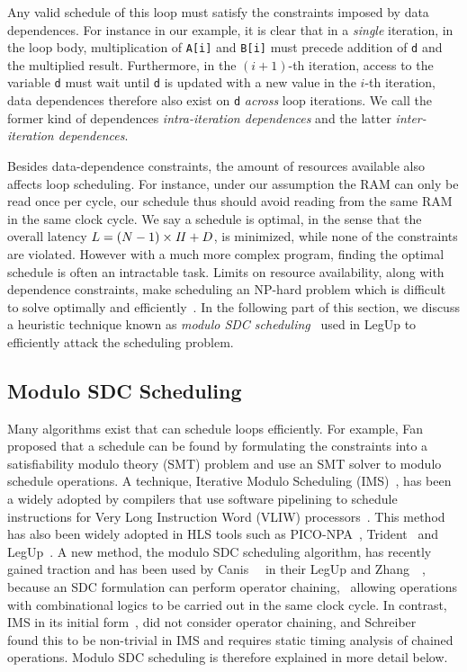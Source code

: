Any valid schedule of this loop must satisfy the constraints imposed by data
dependences.  For instance in our example, it is clear that in a \emph{single}
iteration, in the loop body, multiplication of \verb|A[i]| and \verb|B[i]|
must precede addition of \verb|d| and the multiplied result.  Furthermore, in
the $(i + 1)$-th iteration, access to the variable \verb|d| must wait until
\verb|d| is updated with a new value in the $i$-th iteration, data dependences
therefore also exist on \verb|d| \emph{across} loop iterations.  We call the
former kind of dependences \emph{intra-iteration dependences} and the latter
\emph{inter-iteration dependences}.

Besides data-dependence constraints, the amount of resources available also
affects loop scheduling.  For instance, under our assumption the RAM can only
be read once per cycle, our schedule thus should avoid reading from the same
RAM in the same clock cycle.  We say a schedule is optimal, in the sense that
the overall latency $L = (N - 1) \times \mathit{II} + D$, is minimized, while none
of the constraints are violated.  However with a much more complex program,
finding the optimal schedule is often an intractable task.  Limits on resource
availability, along with dependence constraints, make scheduling an NP-hard
problem which is difficult to solve optimally and efficiently~\cite{hwang91}.
In the following part of this section, we discuss a heuristic technique known
as \emph{modulo SDC scheduling}~\cite{zhang13, canis14} used in LegUp to
efficiently attack the scheduling problem.


\subsection{Modulo SDC Scheduling}
\label{bg:sub:modulo_sdc_scheduling}

Many algorithms exist that can schedule loops efficiently.  For example,
Fan~\etal~\cite{fan08} proposed that a schedule can be found by formulating
the constraints into a satisfiability modulo theory (SMT) problem and use
an SMT solver to modulo schedule operations.  A technique, Iterative Modulo
Scheduling (IMS)~\cite{rau94}, has been a widely adopted by compilers
that use software pipelining to schedule instructions for Very Long
Instruction Word (VLIW) processors~\cite{mcnairy03}.  This method has also
been widely adopted in HLS tools such as PICO-NPA~\cite{schreiber02},
Trident~\cite{tripp05} and LegUp~\cite{canis13, canis14}.  A new method, the
modulo SDC scheduling algorithm, has recently gained traction and has been used
by Canis~\etal~\cite{canis14} in their LegUp and Zhang~\etal~\cite{zhang13},
because an SDC formulation can perform operator chaining, \ie~allowing
operations with combinational logics to be carried out in the same clock cycle.
In contrast, IMS in its initial form~\cite{rau94}, did not consider operator
chaining, and Schreiber~\etal~\cite{schreiber02} found this to be non-trivial
in IMS and requires static timing analysis of chained operations.  Modulo SDC
scheduling is therefore explained in more detail below.

